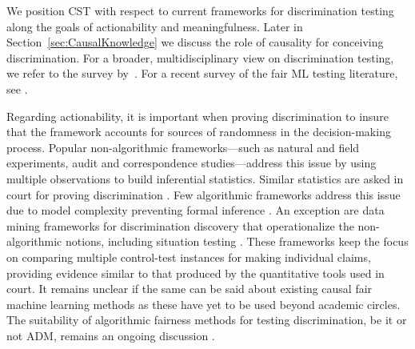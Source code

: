 %
We position CST with respect to current frameworks for discrimination testing along the goals of actionability and meaningfulness.
Later in Section~\ref{sec:CausalKnowledge} we discuss the role of causality for conceiving discrimination.
For a broader, multidisciplinary view on discrimination testing, we refer to the survey by~\textcite{Romei2014MultiSurveyDiscrimination}. 
For a recent survey of the fair ML testing literature, see \textcite{DBLP:journals/tosem/ChenZHHS24}.

Regarding actionability, it is important when proving discrimination to insure that the framework accounts for sources of randomness in the decision-making process. Popular non-algorithmic frameworks---such as natural \parencite{Godin2000Orchestra} and field \parencite{Bertrand2017_FieldExperimentDiscrimination} experiments, audit \parencite{Fix&Struyk1993_ClearConvincingEvidence} and correspondence \parencite{Bertrand2004_EmilyAndGreg, Rooth2021} studies---address this issue by using multiple observations to build inferential statistics. Similar statistics are asked in court for proving discrimination \parencite[Section 6.3]{EU2018_NonDiscriminationLaw}. 
Few algorithmic frameworks address this issue due to model complexity preventing formal inference \parencite{Athey2019MachineLearningForEconomists}. An exception are data mining frameworks for discrimination discovery \parencite{DBLP:conf/kdd/PedreschiRT08, DBLP:journals/tkdd/RuggieriPT10} that operationalize the non-algorithmic notions, including situation testing \parencite{Thanh_KnnSituationTesting2011, Zhang_CausalSituationTesting_2016}.
These frameworks \parencite{TR-DBLP:conf/sigsoft/GalhotraBM17, TR-DBLP:journals/corr/abs-1809-03260, DBLP:journals/jiis/QureshiKKRP20} keep the focus on comparing multiple control-test instances for making individual claims, providing evidence similar to that produced by the quantitative tools used in court.
It remains unclear if the same can be said about existing causal fair machine learning methods
as these have yet to be used beyond academic circles.
The suitability of algorithmic fairness methods for testing discrimination, be it or not ADM, remains an ongoing discussion \parencite{DBLP:conf/fat/WeertsXTOP23}.

